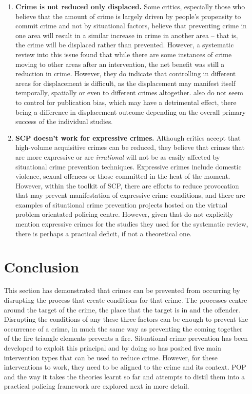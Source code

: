 \begin{enumerate}

 \item{\bf{Crime is not reduced only displaced.} }Some critics, especially those who believe that the amount of crime is largely driven by people’s propensity to commit crime and not by situational factors, believe that preventing crime in one area will result in a similar increase in crime in another area – that is, the crime will be displaced rather than prevented. However, a systematic review into this issue \parencite{guerette2009assessing} found that while there are some instances of crime moving to other areas after an intervention, the net benefit was still a reduction in crime. However, they do indicate that controlling in different areas for displacement is difficult, as the displacement may manifest itself temporally, spatially or even to different crimes altogether.\textcite{guerette2009assessing} also do not seem to control for publication bias, which may have a detrimental effect, there being a difference in displacement outcome depending on the overall primary success of the individual studies.
 
 \item{\bf{SCP doesn't work for expressive crimes.}} Although critics accept that high-volume acquisitive crimes can be reduced, they believe that crimes that are more expressive or are \emph{irrational} will not be as easily affected by situational crime prevention techniques. Expressive crimes include domestic violence, sexual offences or those committed in the heat of the moment. However, within the toolkit of SCP, there are efforts to reduce provocation that may prevent manifestation of expressive crime conditions, and there are examples of situational crime prevention projects hosted on the virtual problem orientated policing centre. However, given that \parencite{guerette2009assessing} do not explicitly mention expressive crimes for the studies they used for the systematic review, there is perhaps a practical deficit, if not a theoretical one.
 
 \end{enumerate}


\section{Conclusion} This section has demonstrated that crimes can be prevented from occurring by disrupting the process that create conditions for that crime. The processes centre around the target of the crime, the place that the target is in and the offender. Disrupting the conditions of any these three factors can be enough to prevent the occurrence of a crime, in much the same way as preventing the coming together of the fire triangle elements prevents a fire. Situational crime prevention has been developed to exploit this principal and by doing so has posited five main intervention types that can be used to reduce crime. However, for these interventions to work, they need to be aligned to the crime and its context. POP and the way it takes the theories learnt so far and attempts to distil them into a practical policing framework are explored next in more detail. 


